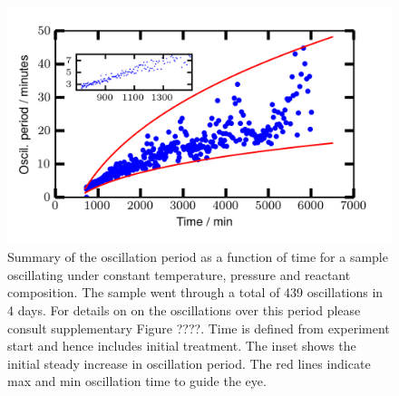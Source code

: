 \documentclass[journal=jacsat,manuscript=article]{achemso}
\begin{document}
\begin{figure}
  \includegraphics[width=12cm]{summary_of_long_measurement.png}
  \caption{Summary of the oscillation period as a function of time for a sample
  oscillating under constant temperature, pressure and reactant composition.
  The sample went through a total of 439 oscillations in 4 days. For details on on
  the oscillations over this period please consult supplementary Figure ????. Time is
  defined from experiment start and hence includes initial treatment. The inset
  shows the initial steady increase in oscillation period. The red lines indicate
  max and min oscillation time to guide the eye.}
  \label{fgr:long_measurement}
\end{figure}
  
\end{document}
